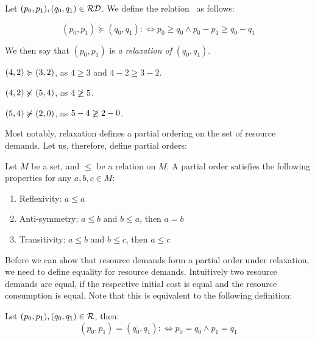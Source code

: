 \begin{definition}[Relaxation]\label{def:relaxation}
   Let \((p_0, p_1), (q_0, q_1) \in \mathcal{RD}\). We define the relation \relaxation ~as follows:

   \[
      (p_0, p_1) \succcurlyeq (q_0, q_1) :\iff p_0 \geq q_0 \wedge p_0 - p_1 \geq q_0 - q_1
   \]
\end{definition}

We then say that \((p_0, p_1)\) is \emph{a relaxation of} \((q_0, q_1)\).

\begin{example}
   \((4, 2) \succcurlyeq (3, 2)\), as \(4 \geq 3\) and \(4 - 2 \geq 3 - 2\).
\end{example}

\begin{example}
   \((4,2) \notrelaxation (5, 4)\), as \(4 \centernot \geq 5\).
\end{example}

\begin{example}
   \((5, 4) \notrelaxation (2, 0)\), as \(5 - 4 \centernot{\geq} 2 - 0\).
\end{example}

Most notably, relaxation defines a partial ordering on the set of resource demands. Let us, therefore, define partial orders:

\begin{definition}
   Let \(M\) be a set, and \(\leq\) be a relation on \(M\). A partial order satisfies the following properties for any \(a, b, c \in M\):
   \begin{enumerate}[I]
      \item Reflexivity: \(a \leq a \) 
      \item Anti-symmetry: \(a \leq b\) and \(b \leq a\), then \(a = b\) 
      \item Transitivity: \(a \leq b\) and \(b \leq c\), then \(a \leq c\)
   \end{enumerate}
\end{definition}

Before we can show that resource demands form a partial order under relaxation, we need to define equality for resource demands. Intuitively two resource demands are equal, if the respective initial cost is equal and the resource consumption is equal. Note that this is equivalent to the following definition:

\begin{definition}
   Let \((p_0, p_1), (q_0, q_1) \in \mathcal{R}\), then: 
   \[
      (p_0, p_1) = (q_0, q_1) :\iff p_0 = q_0 \wedge p_1 = q_1
   \]
\end{definition}

